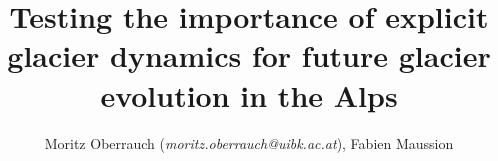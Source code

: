 \documentclass[final]{beamer}
\title{Testing the importance of explicit glacier dynamics for future glacier evolution in the Alps}
\subtitle{}
\author{Moritz Oberrauch (\textit{moritz.oberrauch@uibk.ac.at}), Fabien Maussion}
\begin{document}
\begin{frame}[fragile]
\begin{columns}[t]


\begin{leftcolumn}


\end{leftcolumn}
\end{columns}
\end{frame}
\end{document}
